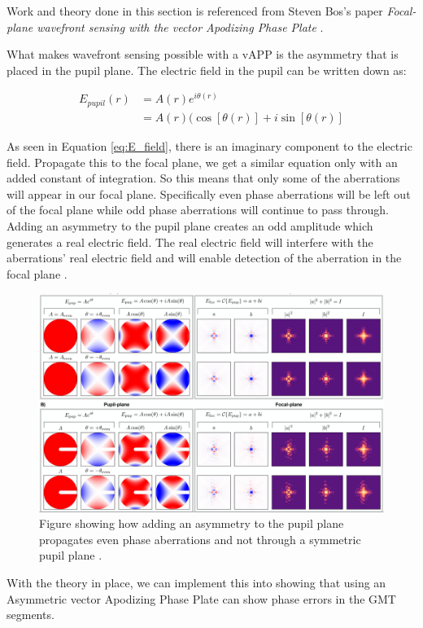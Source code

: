 Work and theory done in this section is referenced from Steven Bos's paper \textit{Focal-plane wavefront sensing with the vector Apodizing Phase Plate} \cite{Bos2019Focal-planePlate}.

What makes wavefront sensing possible with a vAPP is the asymmetry that is placed in the pupil plane.  The electric field in the pupil can be written down as:

\begin{align}
    E_{pupil}(r) &= A(r) e^{i \theta(r)} \\
    &= A(r) (\cos[\theta (r)] + i\sin[\theta (r)]
    \label{eq:E_field}
\end{align}

As seen in Equation \ref{eq:E_field}, there is an imaginary component to the electric field.  Propagate this to the focal plane, we get a similar equation only with an added constant of integration.  So this means that only some of the aberrations will appear in our focal plane.  Specifically even phase aberrations will be left out of the focal plane while odd phase aberrations will continue to pass through.  Adding an asymmetry to the pupil plane creates an odd amplitude which generates a real electric field.  The real electric field will interfere with the aberrations' real electric field and will enable detection of the aberration in the focal plane \cite{Bos2019Focal-planePlate}.



\begin{figure}[H]
\centering
\includegraphics[width=14 cm]{Figures/asymmetry.png}
\caption{Figure showing how adding an asymmetry to the pupil plane propagates even phase aberrations and not through a symmetric pupil plane \cite{Bos2019Focal-planePlate}.}
\label{fig:vapp_concept}
\end{figure}

With the theory in place, we can implement this into showing that using an Asymmetric vector Apodizing Phase Plate can show phase errors in the GMT segments.


